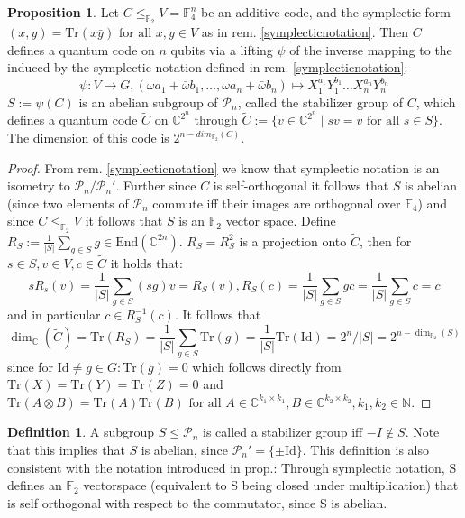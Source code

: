 \documentclass{article}
\def\P{\mathcal{P}}
\def\N{\mathbb{N}}
\def\F{\mathbb{F}}
\def\C{\mathbb{C}}
\def\End{\text{End}}
\def\fa{\text{ for all }}
\def\Tr{\text{Tr}}
\def\Id{\text{Id}}
\theoremstyle{definition}
\newtheorem{prop}[Satz]{Proposition}
\newtheorem{defn}[Satz]{Definition}
\begin{document}
\begin{prop}\label{dimensioncode}
Let $C \leq_{\F_2} V = \F_4^n$ be an additive code, and the symplectic form$ (x,y) = \Tr(x \bar y) \fa x,y \in V$ as in rem. \ref{symplecticnotation}. Then $C$ defines a quantum code on $n$ qubits via a lifting $\psi$ of the inverse mapping to the induced by the symplectic notation defined in rem. \ref{symplecticnotation}:
\[ \psi: V \rightarrow G, (\omega a_1 + \bar \omega b_1, \ldots, \omega a_n + \bar \omega b_n) \mapsto X_1^{a_1}Y_1^{b_1} \ldots X_n^{a_n}Y_n^{b_n} \]
$S:= \psi(C)$ is an abelian subgroup of $\P_n$, called the stabilizer group of $C$, which defines a quantum code $\tilde C$ on $\C^{2^n}$ through $\tilde C := \{ v \in \C^{2^n} \mid sv = v \fa s \in S \}$. The dimension of this code is $2^{n-dim_{\F_2}(C)}$.
\begin{proof}
From rem. \ref{symplecticnotation} we know that symplectic notation is an isometry to $\P_n / \P_n'$. Further since $C$ is self-orthogonal it follows that $S$ is abelian (since two elements of $\P_n$ commute iff their images are orthogonal over $\F_4$) and since $C \leq_{\F_2} V$ it follows that $S$ is an $\F_2$ vector space.
Define $R_S:= \frac{1}{|S|} \sum_{g \in S} g \in \End(\C^{2n})$. $R_S = R_S^2$ is a projection onto $\tilde C$, then for $s \in S, v \in V, c \in \tilde C$ it holds that:   \[ s R_s(v) = \frac{1}{|S|}  \sum_{g \in S} (sg) v = R_S(v),  R_S(c) = \frac{1}{|S|} \sum_{g \in S} gc = \frac{1}{|S|} \sum_{g \in S} c = c \]
and in particular $c \in R_S^{-1}(c)$. It follows that \[ \dim_\C(\tilde C) = \Tr(R_S) = \frac{1}{|S|} \sum_{g \in S} \Tr(g) = \frac{1}{|S|} \Tr(\Id) = 2^n/|S| = 2^{n-\dim_{\F_2}(S)} \] since for $\Id \neq g \in G: \Tr(g) = 0 $ which follows directly from $\Tr(X) = \Tr(Y) = \Tr(Z) = 0$ and $\Tr(A \otimes B)= \Tr(A) \Tr(B) \fa A \in \C^{k_1 \times k_1}, B \in \C^{k_2 \times k_2}, k_1, k_2 \in \N$.
\end{proof}
\end{prop}



\begin{defn}
A subgroup $S \leq \mathcal{P}_n$  is called a stabilizer group iff $-I \notin S$. Note that this implies that $S$ is abelian, since $\P_n' = \{ \pm \Id \}$. This definition is also consistent with the notation introduced in prop.\cite{dimensioncode}: Through symplectic notation, S defines an $\F_2$ vectorspace (equivalent to S being closed under multiplication) that is self orthogonal with respect to the commutator, since S is abelian.
\end{defn}
\end{document}
